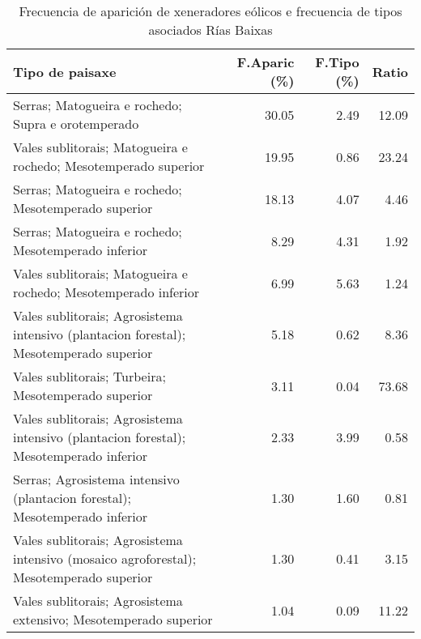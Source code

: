 \begin{table}[p]
\centering
\caption{Frecuencia de aparición de xeneradores eólicos e frecuencia de tipos asociados Rías Baixas} 
\label{veolico12}
\begin{tabular}{lrrr}
  \hline
Tipo de paisaxe & F.Aparic (\%) & F.Tipo (\%) & Ratio \\ 
  \hline
Serras; Matogueira e rochedo; Supra e orotemperado & 30.05 & 2.49 & 12.09 \\ 
  Vales sublitorais; Matogueira e rochedo; Mesotemperado superior & 19.95 & 0.86 & 23.24 \\ 
  Serras; Matogueira e rochedo; Mesotemperado superior & 18.13 & 4.07 & 4.46 \\ 
  Serras; Matogueira e rochedo; Mesotemperado inferior & 8.29 & 4.31 & 1.92 \\ 
  Vales sublitorais; Matogueira e rochedo; Mesotemperado inferior & 6.99 & 5.63 & 1.24 \\ 
  Vales sublitorais; Agrosistema intensivo (plantacion forestal); Mesotemperado superior & 5.18 & 0.62 & 8.36 \\ 
  Vales sublitorais; Turbeira; Mesotemperado superior & 3.11 & 0.04 & 73.68 \\ 
  Vales sublitorais; Agrosistema intensivo (plantacion forestal); Mesotemperado inferior & 2.33 & 3.99 & 0.58 \\ 
  Serras; Agrosistema intensivo (plantacion forestal); Mesotemperado inferior & 1.30 & 1.60 & 0.81 \\ 
  Vales sublitorais; Agrosistema intensivo (mosaico agroforestal); Mesotemperado superior & 1.30 & 0.41 & 3.15 \\ 
  Vales sublitorais; Agrosistema extensivo; Mesotemperado superior & 1.04 & 0.09 & 11.22 \\ 
   \hline
\end{tabular}
\end{table}

